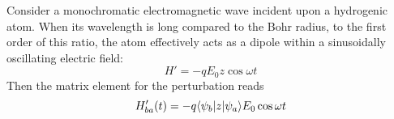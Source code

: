 Consider a monochromatic electromagnetic wave incident upon a hydrogenic atom. 
When its wavelength is long compared to the Bohr radius, to the first order of this ratio, 
the atom effectively acts as a dipole within a sinusoidally oscillating electric field: 
\[ 
    H' = -q E_0 z\cos \omega t
\] 
Then the matrix element for the perturbation reads 
\[ 
    H'_{ba}(t) = -q\langle \psi_b|z|\psi_a\rangle E_0\cos \omega t
\] 


